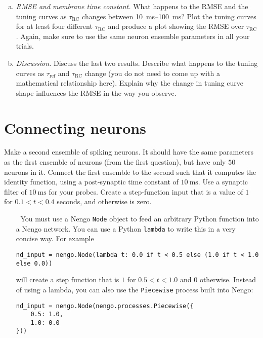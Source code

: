 \begin{enumerate}[a)]
		\item {} \emph{RMSE and membrane time constant.} What happens to the RMSE and the tuning curves as $\tau_\mathrm{RC}$ changes between \SIrange{10}{100}{\milli\second}? Plot the tuning curves for at least four different $\tau_\mathrm{RC}$ and produce a plot showing the RMSE over $\tau_\mathrm{RC}$. Again, make sure to use the same neuron ensemble parameters in all your trials.
		\item {} \emph{Discussion.} Discuss the last two results. Describe what happens to the tuning curves as $\tau_\mathrm{ref}$ and $\tau_\mathrm{RC}$ change (you do not need to come up with a mathematical relationship here). Explain why the change in tuning curve shape influences the RMSE in the way you observe.
	\end{enumerate}

	\newpage


	\section{Connecting neurons}
	
	Make a second ensemble of spiking neurons. It should have the same parameters as the first ensemble of neurons (from the first question), but have only $50$ neurons in it. Connect the first ensemble to the second such that it computes the identity function, using a post-synaptic time constant of $\SI{10}{\milli\second}$. Use a synaptic filter of $\SI{10}{\milli\second}$ for your probes. Create a step-function input that is a value of $1$ for $0.1<t<0.4$ seconds, and otherwise is zero.

	\begin{itemize}
		\item[{\symbolfont 🐍}] You must use a Nengo \texttt{Node} object to feed an arbitrary Python function into a Nengo network. You can use a Python \texttt{lambda} to write this in a very concise way. For example
		\begin{verbatim}
nd_input = nengo.Node(lambda t: 0.0 if t < 0.5 else (1.0 if t < 1.0 else 0.0))
		\end{verbatim}
		will create a step function that is $1$ for $0.5<t<1.0$ and $0$ otherwise. Instead of using a lambda, you can also use the \texttt{Piecewise} process built into Nengo:
		\begin{verbatim}
nd_input = nengo.Node(nengo.processes.Piecewise({
    0.5: 1.0,
    1.0: 0.0
}))
		\end{verbatim}
	\end{itemize}

